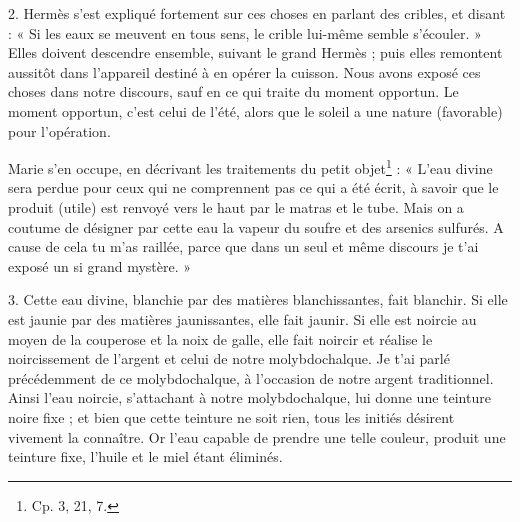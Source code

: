 \documentclass[a4paper, 11pt, oneside, polutonikogreek, french]{article}
\begin{document}
2. Hermès s'est expliqué fortement sur ces choses en parlant des cribles, et disant : « Si les eaux se meuvent en tous sens, le crible lui-même semble s'écouler. » Elles doivent descendre ensemble, suivant le grand Hermès ; puis elles remontent aussitôt dans l'appareil destiné à en opérer la cuisson. Nous avons exposé ces choses dans notre discours, sauf en ce qui traite du moment opportun. Le moment opportun, c'est celui de l'été, alors que le soleil a une nature (favorable) pour l'opération.

Marie s'en occupe, en décrivant les traitements du petit objet\footnote{Cp. 3, 21, 7.} : « L'eau divine sera perdue pour ceux qui ne comprennent pas ce qui a été écrit, à savoir que le produit (utile) est renvoyé vers le haut par le matras et le tube. Mais on a coutume de désigner par cette eau la vapeur du soufre et des arsenics sulfurés. A cause de cela tu m'as raillée, parce que dans un seul et même discours je t'ai exposé un si grand mystère. »

3. Cette eau divine, blanchie par des matières blanchissantes, fait blanchir. Si elle est jaunie par des matières jaunissantes, elle fait jaunir. Si elle est noircie au moyen de la couperose et la noix de galle, elle fait noircir et réalise le noircissement de l'argent et celui de notre molybdochalque. Je t'ai parlé précédemment de ce molybdochalque, à l'occasion de notre argent traditionnel. Ainsi l'eau noircie, s'attachant à notre molybdochalque, lui donne une teinture noire fixe ; et bien que cette teinture ne soit rien, tous les initiés désirent vivement la connaître. Or l'eau capable de prendre une telle couleur, produit une teinture fixe, l'huile et le miel étant éliminés.
\end{document}
